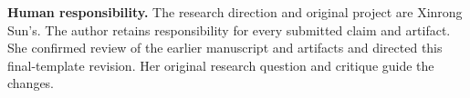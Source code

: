 \textbf{Human responsibility.} The research direction and original project are Xinrong Sun's. The author retains responsibility for every submitted claim and artifact. She confirmed review of the earlier manuscript and artifacts and directed this final-template revision. Her original research question and critique guide the changes.


